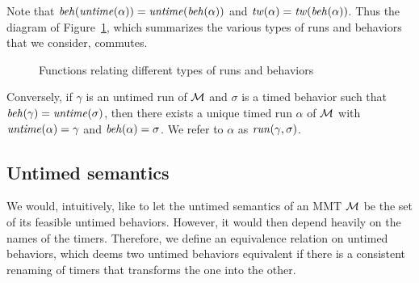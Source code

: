 Note that $\mathit{beh}(\mathit{untime}(\alpha))=\mathit{untime}(\mathit{beh}(\alpha))$ and $\mathit{tw}(\alpha) = \mathit{tw}(\mathit{beh}(\alpha))$.
Thus the diagram of Figure~\ref{fig:diagram}, which summarizes the various types of runs and behaviors that we consider, commutes.
\begin{figure}[h]
\centering
{}
\caption{Functions relating different types of runs and behaviors}
\label{fig:diagram}
\end{figure}
Conversely, if $\gamma$ is an untimed run  of ${\cal M}$ and $\sigma$ is a timed behavior such that $\mathit{beh}(\gamma) = \mathit{untime}(\sigma)$,
then there exists a unique timed run $\alpha$ of ${\cal M}$ with $\mathit{untime}(\alpha) = \gamma$ and $\mathit{beh}(\alpha) = \sigma$.
We refer to $\alpha$ as $\mathit{run}(\gamma,\sigma)$.

\subsection{Untimed semantics}
We would, intuitively, like to let the untimed semantics of an MMT ${\cal M}$ be the set of its feasible untimed behaviors.
However, it would then depend heavily on the names of the timers. Therefore, we define an equivalence relation
on untimed behaviors, which deems two untimed behaviors equivalent if there is a consistent renaming of timers that transforms
the one into the other.

